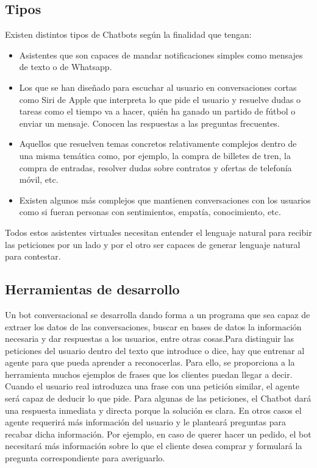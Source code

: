 \subsection{Tipos}

Existen distintos tipos de Chatbots según la finalidad que tengan:
\begin{itemize}
	\item Asistentes que son capaces de mandar notificaciones simples como mensajes de texto o de Whatsapp. 
	\item Los que se han diseñado para escuchar al usuario en conversaciones cortas como Siri de Apple que interpreta lo que pide el usuario y resuelve dudas o tareas como el tiempo va a hacer, quién ha ganado un partido de fútbol o enviar un mensaje. Conocen las respuestas a las preguntas frecuentes.
	\item Aquellos que resuelven temas concretos relativamente complejos dentro de una misma temática como, por ejemplo, la compra de billetes de tren, la compra de entradas, resolver dudas sobre contratos y ofertas de telefonía móvil, etc.
	\item Existen algunos más complejos que mantienen conversaciones con los usuarios como si fueran personas con sentimientos, empatía, conocimiento, etc.
\end{itemize}

Todos estos asistentes virtuales necesitan entender el lenguaje natural para recibir las peticiones por un lado y por el otro ser capaces de generar lenguaje natural para contestar. 


\subsection{Herramientas de desarrollo}

Un bot conversacional se desarrolla dando forma a un programa que sea capaz de extraer los datos de las conversaciones, buscar en bases de datos la información necesaria y dar respuestas a los usuarios, entre otras cosas.Para distinguir las peticiones del usuario dentro del texto que introduce o dice, hay que entrenar al agente para que pueda aprender a reconocerlas. Para ello, se proporciona a la herramienta muchos ejemplos de frases que los clientes puedan llegar a decir. Cuando el usuario real introduzca una frase con una petición similar, el agente será capaz de deducir lo que pide. Para algunas de las peticiones, el Chatbot dará una respuesta inmediata y directa porque la solución es clara. En otros casos el agente requerirá más información del usuario y le planteará preguntas para recabar dicha información. Por ejemplo, en caso de querer hacer un pedido, el bot necesitará más información sobre lo que el cliente desea comprar y formulará la pregunta correspondiente para averiguarlo.

